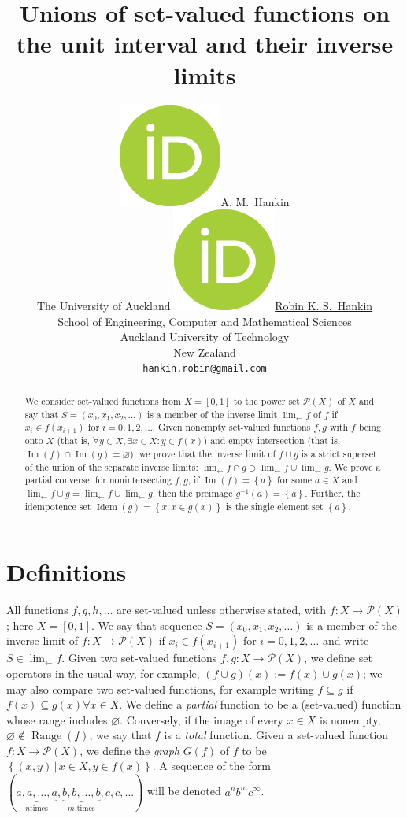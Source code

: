\documentclass{article}
\title{Unions of set-valued functions on the unit interval and their inverse limits}
\author{{\includegraphics[scale=0.06]{orcid.png}\hspace{1mm}A. M.~Hankin}\\
  The University of Auckland
	\And 
	\href{https://orcid.org/0000-0001-5982-0415}{\includegraphics[scale=0.06]{orcid.png}\hspace{1mm}Robin K. S.~Hankin} \\
	School of Engineering, Computer and Mathematical Sciences\\
	Auckland University of Technology\\
        New Zealand\\
	\texttt{hankin.robin@gmail.com} \\
}
\theoremstyle{definition}
\let\emptyset\varnothing
\begin{document}
\maketitle

\newcommand{\invlim}[1]{\lim_{\leftarrow} #1}

\begin{abstract}
We consider set-valued functions from $X=\left[0,1\right]$ to the
power set $\mathcal{P}(X)$ of $X$ and say that $S = (x_0,x_1,
x_2,\ldots)$ is a member of the inverse limit $\invlim{f}$ of $f$ if
$x_i\in f(x_{i+1})$ for $i = 0,1,2,\ldots$.  Given nonempty set-valued
functions $f,g$ with $f$ being onto $X$ (that is, $\forall y\in X,
\exists x\in X\colon y\in f(x)$) and empty intersection (that is,
$\operatorname{Im}(f)\cap\operatorname{Im}(g) = \emptyset$), we prove
that the inverse limit of $f\cup g$ is a strict superset of the union
of the separate inverse limits: $\invlim{f\cap g}
\supset\invlim{f}\cup\invlim{g}$.  We prove a partial converse: for
nonintersecting $f,g$, if $\operatorname{Im}(f)=\left\lbrace
a\right\rbrace$ for some $a\in X$ and $\invlim{f\cup g} =
\invlim{f}\cup\invlim{g$}, then the preimage $g^{-1}(a)=\left\lbrace
a\right\rbrace$.  Further, the idempotence set
$\operatorname{Idem}(g)=\left\lbrace x\colon x\in g(x)\right\rbrace$
is the single element set $\left\lbrace a\right\rbrace$.
\end{abstract}


\section{Definitions}

All functions $f,g,h,\ldots$ are set-valued unless otherwise stated,
with $f\colon X\longrightarrow\mathcal{P}(X)$; here $X=[0,1]$.  We say
that sequence $S = (x_0 , x_1 , x_2 ,\ldots)$ is a member of the
inverse limit of $f\colon X\longrightarrow \mathcal{P}(X)$ if $x_i \in
f(x_{i+1})$ for $i = 0, 1, 2,\ldots$ and write
$S\in\lim_{\leftarrow}f$.  Given two set-valued functions $f,g\colon X
\rightarrow \mathcal{P}(X)$, we define set operators in the usual way,
for example, $(f\cup g)(x) := f(x)\cup g(x)$; we may also compare two
set-valued functions, for example writing $f\subseteq g$ if
$f(x)\subseteq g(x)\forall x\in X$.  We define a {\em partial}
function to be a (set-valued) function whose range includes
$\emptyset$.  Conversely, if the image of every $x\in X$ is nonempty,
$\emptyset\not\in\operatorname{Range}(f)$, we say that $f$ is a {\em
  total} function.  Given a set-valued function $f\colon X
\longrightarrow \mathcal{P}(X)$, we define the {\em graph} $G(f)$ of
$f$ to be $\left\lbrace (x, y) \,|\, x\in X,y \in f(x)\right\rbrace$.
A sequence of the form $( \underbrace{a, a,\ldots, a}_{\text{$n$
    times}}, \underbrace{b, b,\ldots, b}_{\text{$m$ times}},
c,c,\ldots)$ will be denoted $a^nb^mc^\infty$.
\end{document}
